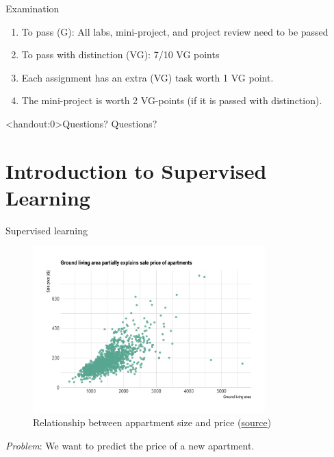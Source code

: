 \documentclass[10pt,handout]{beamer}
\begin{document}
\begin{frame}{Examination}

\begin{enumerate}
\item To pass (G): All labs, mini-project, and project review need to be passed\pause
\item To pass with distinction (VG): 7/10 VG points\pause
\item Each assignment has an extra (VG) task worth 1 VG point.\pause
\item The mini-project is worth 2 VG-points (if it is passed with distinction).
\end{enumerate}

\end{frame}

\begin{frame}<handout:0>{Questions?}
Questions?
\end{frame}


\section{Introduction to Supervised Learning}
\frame{\sectionpage}

\begin{frame}{Supervised learning}

\begin{figure}[h]
\caption{Relationship between appartment size and price (\href{https://www.data-to-viz.com/story/TwoNum.html}{source})}
\centering
\includegraphics[width=0.8\textwidth]{figs/scatter_apartment.png}
\end{figure}

\emph{Problem}: We want to predict the price of a new apartment.

\end{frame}
\end{document}
